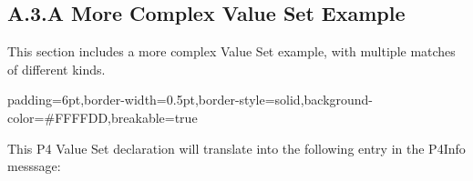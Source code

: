 \documentclass[11pt]{article}
\begin{document}
{%
\subsection{A.3.\hspace*{0.5em}A More Complex Value Set Example}\label{sec-value-set-example}%

\noindent{}This section includes a more complex Value Set example, with multiple matches of
different kinds.%

\begin{mdbmargintb}{6pt}{6pt}%
\begin{mdblock}{padding=6pt,border-width=0.5pt,border-style=solid,background-color=\#FFFFDD,breakable=true}%
\begin{mdpre}%
\end{mdpre}%
\end{mdblock}%
\end{mdbmargintb}%

\noindent{}This P4 Value Set declaration will translate into the following entry in the
P4Info messsage:%

}
\end{document}
